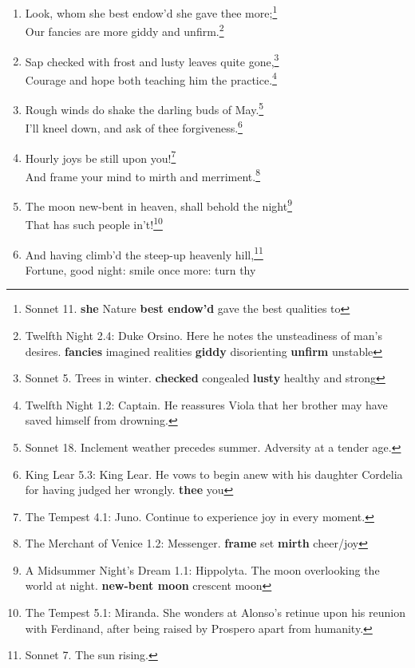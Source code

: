 \documentclass[17pt,twoside]{extarticle}
\begin{document}
\begin{enumerate}
  Now my charms are all o'erthrown,\footnote{The Tempest Epilogue:
    Prospero. \textbf{charms} spells/enchantments \textbf{o'erthrown}
    been put to an end}\\Begot of nothing but vain fantasy.\footnote{Romeo
    and Juliet 1.4: Mercutio. ``I talk of dreams.'' \textbf{begot}
    brought into existence \textbf{vain} useless}
\item
  Look, whom she best endow'd she gave thee more;\footnote{Sonnet 11.
    \textbf{she} Nature \textbf{best endow'd} gave the best qualities to}\\Our
  fancies are more giddy and unfirm.\footnote{Twelfth Night 2.4: Duke
    Orsino. Here he notes the unsteadiness of man's desires.
    \textbf{fancies} imagined realities \textbf{giddy} disorienting
    \textbf{unfirm} unstable}
\item
  Sap checked with frost and lusty leaves quite gone,\footnote{Sonnet 5.
    Trees in winter. \textbf{checked} congealed \textbf{lusty} healthy
    and strong}\\Courage and hope both teaching him the
  practice.\footnote{Twelfth Night 1.2: Captain. He reassures Viola that
    her brother may have saved himself from drowning.}
\item
  Rough winds do shake the darling buds of May.\footnote{Sonnet 18.
    Inclement weather precedes summer. Adversity at a tender age.}\\I'll
  kneel down, and ask of thee forgiveness.\footnote{King Lear 5.3: King
    Lear. He vows to begin anew with his daughter Cordelia for having
    judged her wrongly. \textbf{thee} you}
\item
  Hourly joys be still upon you!\footnote{The Tempest 4.1: Juno.
    Continue to experience joy in every moment.}\\And frame your mind to
  mirth and merriment.\footnote{The Merchant of Venice 1.2: Messenger.
    \textbf{frame} set \textbf{mirth} cheer/joy}
\item
  The moon new-bent in heaven, shall behold the night\footnote{A
    Midsummer Night's Dream 1.1: Hippolyta. The moon overlooking the
    world at night. \textbf{new-bent moon} crescent moon}\\That has such
  people in't!\footnote{The Tempest 5.1: Miranda. She wonders at
    Alonso's retinue upon his reunion with Ferdinand, after being raised
    by Prospero apart from humanity.}
\item
  And having climb'd the steep-up heavenly hill,\footnote{Sonnet 7. The
    sun rising.}\\Fortune, good night: smile once more: turn thy

\end{enumerate}
\end{document}
